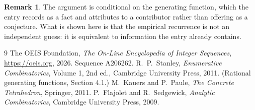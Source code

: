 \documentclass[11pt,a4paper]{article}
\theoremstyle{plain}
\theoremstyle{definition}
\newtheorem{remark}[theorem]{Remark}
\begin{document}
\begin{remark}
The argument is conditional on the generating function, which the entry records as a fact and
attributes to a contributor rather than offering as a conjecture. What is shown here is that
the empirical recurrence is not an independent guess: it is equivalent to information the
entry already contains.
\end{remark}

\begin{thebibliography}{9}
 The OEIS Foundation, \emph{The On-Line Encyclopedia of Integer
Sequences}, \url{https://oeis.org}, 2026. Sequence A206262.
 R.~P.~Stanley, \emph{Enumerative Combinatorics}, Volume 1, 2nd ed.,
Cambridge University Press, 2011. (Rational generating functions, Section 4.1.)
 M.~Kauers and P.~Paule, \emph{The Concrete Tetrahedron}, Springer, 2011.
 P.~Flajolet and R.~Sedgewick, \emph{Analytic Combinatorics}, Cambridge
University Press, 2009.
\end{thebibliography}
\end{document}
